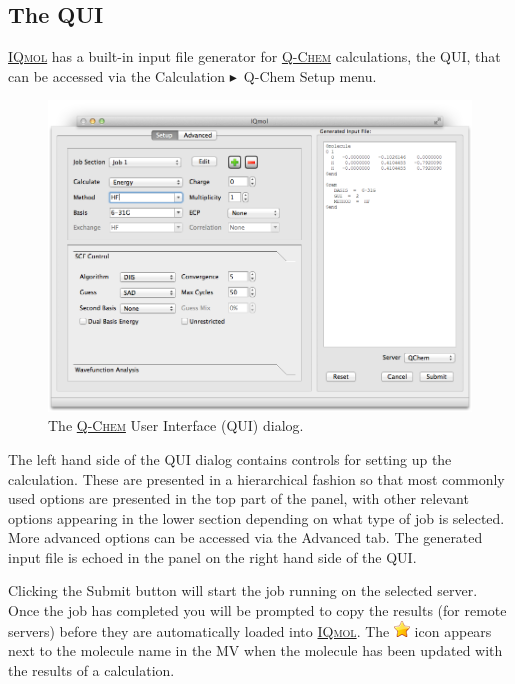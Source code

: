 \documentclass[a4paper,12pt]{article}
\newcommand{\qchem}{\href{http://q-chem.com}{{\scshape Q-Chem}}}
\newcommand{\iqmol}{\href{http://iqmol.org}{{\scshape IQmol}}}
\newcommand{\bt}{\ensuremath{\blacktriangleright}}
\begin{document}
\subsection{The QUI}

\iqmol{} has a built-in input file generator for \qchem{} calculations, the
QUI, that can be accessed via the Calculation \bt\  Q-Chem Setup menu.  
\begin{figure}[h]
\begin{center}
\includegraphics[scale=0.4]{figures/QUI.png}
\caption{The \qchem{} User Interface (QUI) dialog.}
\end{center}
\end{figure}

The left hand side of the QUI dialog contains controls for setting up the
calculation.  These are presented in a hierarchical fashion so that most
commonly used options are presented in the top part of the panel, with other
relevant options appearing in the lower section depending on what type of job
is selected.  More advanced options can be accessed via the Advanced tab.  The
generated input file is echoed in the panel on the right hand side of the QUI.

Clicking the Submit button will start the job running on the selected server.
Once the job has completed you will be prompted to copy the results (for remote
servers) before they are automatically loaded into \iqmol{}.  The
\includegraphics[scale=0.6]{figures/Favourites.png} icon appears next to the
molecule name in the MV when the molecule has been updated with the
results of a calculation.
\end{document}
